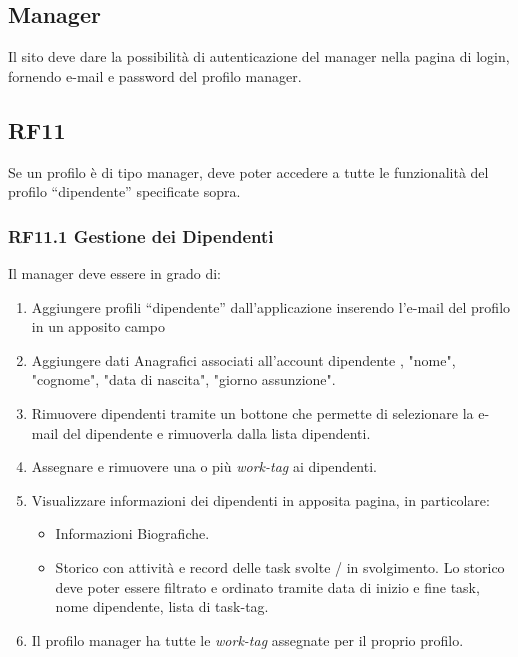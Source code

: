 \documentclass{report}
\begin{document}
\subsection{Manager}
Il sito deve dare la possibilità di autenticazione del manager nella pagina di login, fornendo e-mail e password del profilo manager.

\subsection*{RF11}
Se un profilo è di tipo manager, deve poter accedere a tutte le funzionalità del profilo “dipendente” specificate sopra.

\subsubsection*{RF11.1 Gestione dei Dipendenti}
Il manager deve essere in grado di:

\begin{enumerate}
	
	\item Aggiungere profili “dipendente” dall’applicazione inserendo l’e-mail del profilo in un apposito campo
	\item Aggiungere dati Anagrafici associati all'account dipendente , "nome", "cognome", "data di nascita", "giorno assunzione".
	\item Rimuovere dipendenti tramite un bottone che permette di selezionare la 
	e-mail del dipendente e rimuoverla dalla lista dipendenti.
	
	\item Assegnare e rimuovere una o più \textit{work-tag} ai dipendenti. 
	
	\item Visualizzare informazioni dei dipendenti in apposita pagina, in particolare:
	
	\begin{itemize}
		\item Informazioni Biografiche.
		\item Storico con attività e record delle task svolte / in svolgimento. Lo storico deve poter essere filtrato e ordinato tramite data di inizio e fine task, nome dipendente, lista di task-tag.
		
	\end{itemize}
	
	\item Il profilo manager ha tutte le \textit{work-tag} assegnate per il proprio profilo.
		
\end{enumerate}
\end{document}
